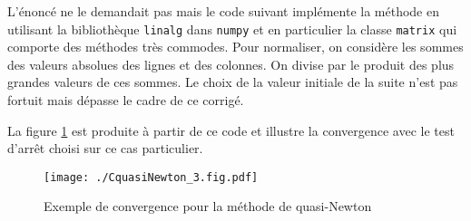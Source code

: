 L'énoncé ne le demandait pas mais le code suivant implémente la méthode en utilisant la bibliothèque \texttt{linalg} dans \texttt{numpy} et en particulier la classe \texttt{matrix} qui comporte des méthodes très commodes.\newline
Pour normaliser, on considère les sommes des valeurs absolues des lignes et des colonnes. On divise par le produit des plus grandes valeurs de ces sommes. Le choix de la valeur initiale de la suite n'est pas fortuit mais dépasse le cadre de ce corrigé.

La figure \ref{fig:CquasiNewton_3} est produite à partir de ce code et illustre la convergence avec le test d'arrêt choisi sur ce cas particulier.
\begin{figure}[h]
  \centering
  \texttt{[image: ./CquasiNewton\_3.fig.pdf]}
  \caption{Exemple de convergence pour la méthode de quasi-Newton}
  \label{fig:CquasiNewton_3}
\end{figure}

